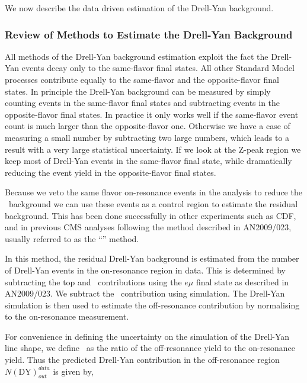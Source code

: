 We now describe the data driven estimation of the Drell-Yan background.

%
%
%
\subsubsection{Review of Methods to Estimate the Drell-Yan Background}

All methods of the Drell-Yan background estimation exploit the fact
the Drell-Yan events decay only to the same-flavor final states. All
other Standard Model processes contribute equally to the same-flavor
and the opposite-flavor final states. In principle the Drell-Yan
background can be measured by simply counting events in the
same-flavor final states and subtracting events in the opposite-flavor
final states. In practice it only works well if the same-flavor event
count is much larger than the opposite-flavor one. Otherwise we have a
case of measuring a small number by subtracting two large numbers,
which leads to a result with a very large statistical uncertainty. If we
look at the Z-peak region we keep most of Drell-Yan events in the
same-flavor final state, while dramatically reducing the event yield
in the opposite-flavor final states.

Because we veto the same flavor on-resonance events in the analysis to reduce the \zx~background
we can use these events as a control region to estimate the residual background.
This has been done successfully in other experiments such as CDF, and in previous CMS analyses  following the method described
in AN2009/023, usually referred to as the ``\routin'' method.

In this method, the residual Drell-Yan background is estimated from the number of Drell-Yan events 
in the on-resonance region in data.
This is determined
by subtracting the top and \ww~contributions using the $e\mu$ final state as described in AN2009/023.
We subtract the \zv~contribution using simulation.
The Drell-Yan simulation is then used to estimate the off-resonance contribution by normalising to
the on-resonance measurement. 

For convenience in defining the uncertainty on the simulation of the
Drell-Yan line shape, we define \routin~as the ratio of the off-resonance yield
to the on-resonance yield.
Thus the predicted Drell-Yan contribution in the off-resonance region $N(\mathrm{DY})^{data}_{out}$ is given by,


